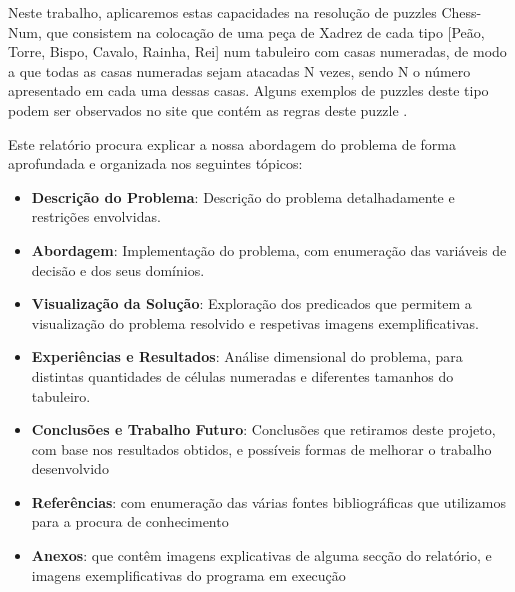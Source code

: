 \documentclass[runningheads]{llncs}
\begin{document}
Neste trabalho, aplicaremos estas capacidades na resolução de puzzles Chess-Num, que consistem na colocação de uma peça de Xadrez de cada tipo [Peão, Torre, Bispo, Cavalo, Rainha, Rei] 
num tabuleiro com casas numeradas, de modo a que todas as casas numeradas sejam atacadas N vezes, sendo N o número apresentado em cada uma dessas casas. 
Alguns exemplos de puzzles deste tipo podem ser observados no site que contém as regras deste puzzle \cite{chessnum}.

\newpage
Este relatório procura explicar a nossa abordagem do problema de forma aprofundada e organizada nos seguintes tópicos:

\begin{itemize}
    \item \textbf{Descrição do Problema}: Descrição do problema detalhadamente e restrições envolvidas.
    \item \textbf{Abordagem}: Implementação do problema, com enumeração das variáveis de decisão e dos seus domínios.
    \item \textbf{Visualização da Solução}: Exploração dos predicados que permitem a visualização do problema resolvido e respetivas imagens exemplificativas.
    \item \textbf{Experiências e Resultados}: Análise dimensional do problema, para distintas quantidades de células numeradas e diferentes tamanhos do tabuleiro. 
    \item \textbf{Conclusões e Trabalho Futuro}: Conclusões que retiramos deste projeto, com base nos resultados obtidos, e possíveis formas de melhorar o trabalho desenvolvido
    \item \textbf{Referências}: com enumeração das várias fontes bibliográficas que utilizamos para a procura de conhecimento
    \item \textbf{Anexos}: que contêm imagens explicativas de alguma secção do relatório, e imagens exemplificativas do programa em execução
\end{itemize}
\end{document}
